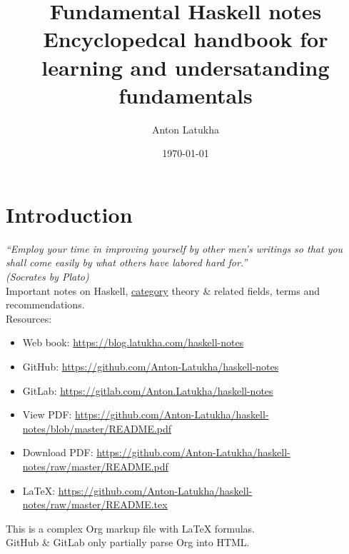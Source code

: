 \documentclass[a4paper,14pt,oneside]{book}
\author{Anton Latukha}
\date{\today}
\title{Fundamental Haskell notes\\\medskip
\large Encyclopedcal handbook for learning and undersatanding fundamentals}
\begin{document}
\maketitle
\setcounter{tocdepth}{10}
\tableofcontents

\setcounter{tocdepth}{10}
\tableofcontents

\part{Introduction}
\label{sec:org40086be}

\emph{“Employ your time in improving yourself by other men's writings so that you shall come easily by what others have labored hard for.”\\
(Socrates by Plato)}\\

Important notes on Haskell, \hyperref[org69f32f1]{category} theory \& related fields, terms and recommendations.\\

Resources:\\
\begin{itemize}
\item Web book: \url{https://blog.latukha.com/haskell-notes}\\
\item GitHub: \url{https://github.com/Anton-Latukha/haskell-notes}\\
\item GitLab: \url{https://gitlab.com/Anton.Latukha/haskell-notes}\\
\item View PDF: \url{https://github.com/Anton-Latukha/haskell-notes/blob/master/README.pdf}\\
\item Download PDF: \url{https://github.com/Anton-Latukha/haskell-notes/raw/master/README.pdf}\\
\item \LaTeX{}: \url{https://github.com/Anton-Latukha/haskell-notes/raw/master/README.tex}\\
\end{itemize}

This is a complex Org markup file with \LaTeX{} formulas.\\
GitHub \& GitLab only partially parse Org into HTML.\\
\end{document}
